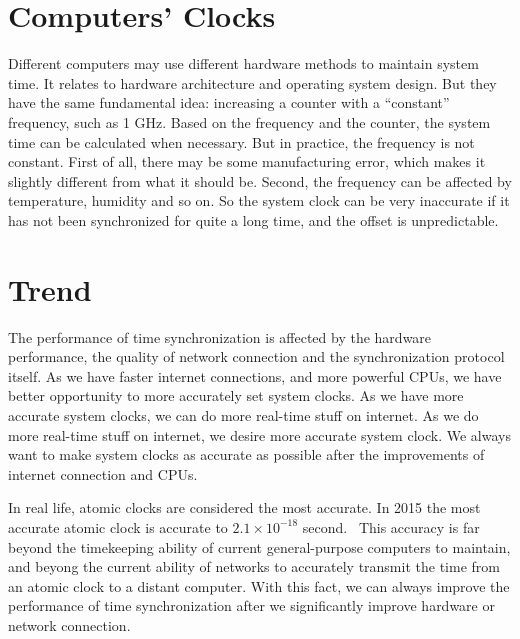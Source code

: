 \section{Computers' Clocks}
\label{sec:computers_clocks}
Different computers may use different hardware methods to maintain system time.
It relates to hardware architecture and operating system design. But they have
the same fundamental idea: increasing a counter with a ``constant'' frequency,
such as 1 GHz.
Based on the frequency and the counter, the system time can be calculated
when necessary. But in practice, the frequency is not constant. First of all,
there may be some manufacturing error, which makes it slightly different from
what it should be. Second, the frequency can be affected by temperature,
humidity and so on. So the system clock can be very inaccurate if it has not
been synchronized for quite a long time, and the offset is unpredictable.

\section{Trend}
\label{sec:trend}
The performance of time synchronization is affected by the hardware
performance, the quality of network connection and the synchronization protocol
itself. 
As we have faster internet connections, and more powerful CPUs, we have better
opportunity to more accurately set system clocks. As we have more accurate
system clocks, we can do more real-time stuff on internet. As we do more
real-time stuff on internet, we desire more accurate system clock. We always
want to make system clocks as accurate as possible after the improvements of
internet connection and CPUs. 

In real life, atomic clocks are considered the most accurate. In 2015 the most
accurate atomic clock is accurate to $2.1\times 10^{-18}$
second.~\cite{atomic_clock} 
This accuracy is far beyond the timekeeping ability of current general-purpose
computers to maintain, and beyong the current ability of networks to accurately
transmit the time from an atomic clock to a distant computer. With this fact,
we can always improve the performance of time synchronization after we
significantly improve hardware or network connection.
